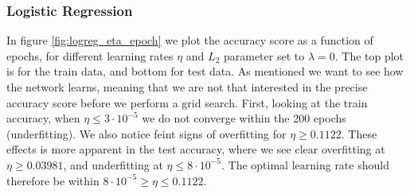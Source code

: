 \documentclass[12pt]{extarticle}
\begin{document}
\subsubsection{Logistic Regression}

In figure \ref{fig:logreg_eta_epoch} we plot the accuracy score as a function of epochs, for different learning rates $\eta$ and $L_2$ parameter set to $\lambda = 0$. The top plot is for the train data, and bottom for test data. As mentioned we want to see how the network learns, meaning that we are not that interested in the precise accuracy score before we perform a grid search. First, looking at the train accuracy, when $\eta \leq 3\cdot 10^{-5}$ we do not converge within the 200 epochs (underfitting). We also notice feint signs of overfitting for $\eta\geq 0.1122$. These effects is more apparent in the test accuracy, where we see clear overfitting at $\eta \geq 0.03981$, and underfitting at $\eta\leq 8\cdot 10^{-5}$. The optimal learning rate should therefore be within $8\cdot 10^{-5} \geq \eta \leq 0.1122$.
\end{document}
